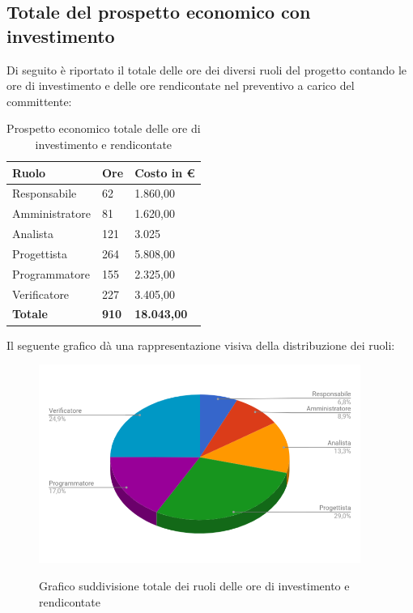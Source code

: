\documentclass[PianoDiProgetto.tex]{subfiles}
\begin{document}
\subsection{Totale del prospetto economico con investimento}
Di seguito è riportato il totale delle ore dei diversi ruoli del progetto contando le ore di investimento e delle ore rendicontate nel preventivo a carico del committente:
\begin{center}
	\begin{table}[htbp]
		\centering
		\renewcommand\arraystretch{1.5}
		\begin{tabularx}{\textwidth}{p{5cm}|p{4cm}|p{4cm}}
			\hline
			\textbf{Ruolo} & \textbf{Ore} & \textbf{Costo in \euro} \\
			\hline
			Responsabile & 62 & 1.860,00 \\
			\hline
			Amministratore & 81 & 1.620,00 \\
			\hline
			Analista & 121 & 3.025 \\
			\hline
			Progettista & 264 & 5.808,00 \\
			\hline
			Programmatore & 155 & 2.325,00 \\
			\hline
			Verificatore & 227 & 3.405,00 \\
			\hline
			\textbf{Totale} & \textbf{910} & \textbf{18.043,00}\\
			\hline
		\end{tabularx}
	\caption{Prospetto economico totale delle ore di investimento e rendicontate}
	\label{my-label}
	\end{table} 
\end{center}
Il seguente grafico dà una rappresentazione visiva della distribuzione dei ruoli:
\begin{figure}[ht]
	\centering
	\includegraphics[width=10.5cm]{images/prospettoEconomico/totInv.png}
	\label{fig:foo}
	\caption{Grafico suddivisione totale dei ruoli delle ore di investimento e rendicontate}
\end{figure} 
\end{document}
